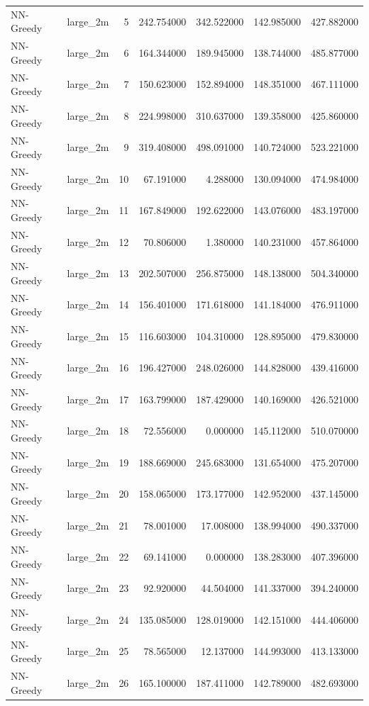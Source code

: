 \begin{tabular}{llrrrrr}
NN-Greedy & large_2m & 5 & 242.754000 & 342.522000 & 142.985000 & 427.882000 \\
NN-Greedy & large_2m & 6 & 164.344000 & 189.945000 & 138.744000 & 485.877000 \\
NN-Greedy & large_2m & 7 & 150.623000 & 152.894000 & 148.351000 & 467.111000 \\
NN-Greedy & large_2m & 8 & 224.998000 & 310.637000 & 139.358000 & 425.860000 \\
NN-Greedy & large_2m & 9 & 319.408000 & 498.091000 & 140.724000 & 523.221000 \\
NN-Greedy & large_2m & 10 & 67.191000 & 4.288000 & 130.094000 & 474.984000 \\
NN-Greedy & large_2m & 11 & 167.849000 & 192.622000 & 143.076000 & 483.197000 \\
NN-Greedy & large_2m & 12 & 70.806000 & 1.380000 & 140.231000 & 457.864000 \\
NN-Greedy & large_2m & 13 & 202.507000 & 256.875000 & 148.138000 & 504.340000 \\
NN-Greedy & large_2m & 14 & 156.401000 & 171.618000 & 141.184000 & 476.911000 \\
NN-Greedy & large_2m & 15 & 116.603000 & 104.310000 & 128.895000 & 479.830000 \\
NN-Greedy & large_2m & 16 & 196.427000 & 248.026000 & 144.828000 & 439.416000 \\
NN-Greedy & large_2m & 17 & 163.799000 & 187.429000 & 140.169000 & 426.521000 \\
NN-Greedy & large_2m & 18 & 72.556000 & 0.000000 & 145.112000 & 510.070000 \\
NN-Greedy & large_2m & 19 & 188.669000 & 245.683000 & 131.654000 & 475.207000 \\
NN-Greedy & large_2m & 20 & 158.065000 & 173.177000 & 142.952000 & 437.145000 \\
NN-Greedy & large_2m & 21 & 78.001000 & 17.008000 & 138.994000 & 490.337000 \\
NN-Greedy & large_2m & 22 & 69.141000 & 0.000000 & 138.283000 & 407.396000 \\
NN-Greedy & large_2m & 23 & 92.920000 & 44.504000 & 141.337000 & 394.240000 \\
NN-Greedy & large_2m & 24 & 135.085000 & 128.019000 & 142.151000 & 444.406000 \\
NN-Greedy & large_2m & 25 & 78.565000 & 12.137000 & 144.993000 & 413.133000 \\
NN-Greedy & large_2m & 26 & 165.100000 & 187.411000 & 142.789000 & 482.693000 \\

\end{tabular}
